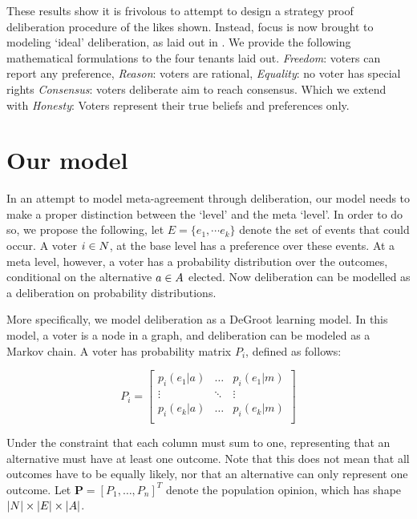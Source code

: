 These results show it is frivolous to attempt to design a strategy proof deliberation procedure of the likes shown. Instead, focus is now brought to modeling `ideal' deliberation, as laid out in . We provide the following mathematical formulations to the four tenants laid out. \emph{Freedom}: voters can report any preference, \emph{Reason}: voters are rational, \emph{Equality}: no voter has special rights \emph{Consensus}:  voters deliberate aim to reach consensus. Which we extend with \emph{Honesty}: Voters represent their true beliefs and preferences only.


\section{Our model}
\label{sec: main model}


In an attempt to model meta-agreement through deliberation, our model needs to make a proper distinction between the `level' and the meta `level'. In order to do so, we propose the following, let \(E = \{e_{1}, \cdots e_{k}\}\) denote the set of events that could occur. A voter $i \in N$, at the base level has a preference over these events. At a meta level, however, a voter has a probability distribution over the outcomes, conditional on the alternative \(a \in A\) elected. Now deliberation can be modelled as a deliberation on probability distributions.

More specifically, we model deliberation as a DeGroot learning model. In this model, a voter is a node in a graph, and deliberation can be modeled as a Markov chain. A voter has probability matrix $P_i$, defined as follows:

\[
	P_i =\begin{bmatrix}
		p_i(e_1 | a) & \dots  & p_i(e_1 | m) \\
		\vdots       & \ddots & \vdots       \\
		p_i(e_k | a) & \dots  & p_i(e_k | m) \\
	\end{bmatrix}
\]

Under the constraint that each column must sum to one, representing that an alternative must have at least one outcome. Note that this does not mean that all outcomes have to be equally likely, nor that an alternative can only represent one outcome.  Let $\boldsymbol{P}= [P_1, \dots, P_{n}]^{T}$ denote the population opinion, which has shape \(|N| \times |E| \times |A|\).

